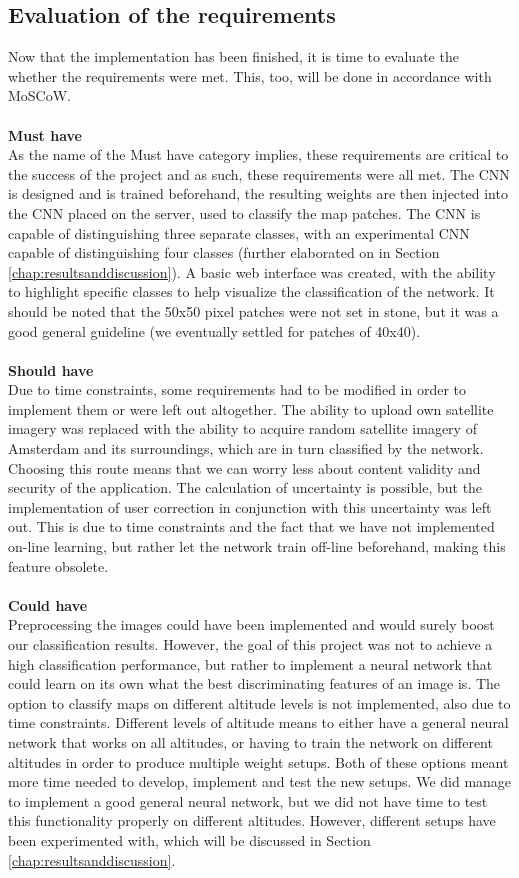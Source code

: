 \documentclass[a4paper,onecolumn]{report}
\begin{document}
\subsection{Evaluation of the requirements}
Now that the implementation has been finished, it is time to evaluate the whether the requirements were met. This, too, will be done in accordance with MoSCoW.\\
\\
\textbf{Must have}\\
As the name of the Must have category implies, these requirements are critical to the success of the project and as such, these requirements were all met. The CNN is designed and is trained beforehand, the resulting weights are then injected into the CNN placed on the server, used to classify the map patches. The CNN is capable of distinguishing three separate classes, with an experimental CNN capable of distinguishing four classes (further elaborated on in Section \ref{chap:resultsanddiscussion}).
A basic web interface was created, with the ability to highlight specific classes to help visualize the classification of the network. It should be noted that the 50x50 pixel patches were not set in stone, but it was a good general guideline (we eventually settled for patches of 40x40).\\
\\
\textbf{Should have}\\
Due to time constraints, some requirements had to be modified in order to implement them or were left out altogether. The ability to upload own satellite imagery was replaced with the ability to acquire random satellite imagery of Amsterdam and its surroundings, which are in turn classified by the network. Choosing this route means that we can worry less about content validity and security of the application. The calculation of uncertainty is possible, but the implementation of user correction in conjunction with this uncertainty was left out. This is due to time constraints and the fact that we have not implemented on-line learning, but rather let the network train off-line beforehand, making this feature obsolete.\\
\\
\textbf{Could have}\\
Preprocessing the images could have been implemented and would surely boost our classification results. However, the goal of this project was not to achieve a high classification performance, but rather to implement a neural network that could learn on its own what the best discriminating features of an image is. The option to classify maps on different altitude levels is not implemented, also due to time constraints. Different levels of altitude means to either have a general neural network that works on all altitudes, or having to train the network on different altitudes in order to produce multiple weight setups. Both of these options meant more time needed to develop, implement and test the new setups. We did manage to implement a good general neural network, but we did not have time to test this functionality properly on different altitudes. However, different setups have been experimented with, which will be discussed in Section \ref{chap:resultsanddiscussion}.\\
\end{document}
